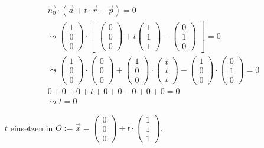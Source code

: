 \begin{gather}
	\vec{n_0} \cdot (\vec{a}+t\cdot \vec{r}-\vec{p})=0\\
	\leadsto 
	\begin{pmatrix}
	1\\0\\0
	\end{pmatrix} \cdot 
	\begin{bmatrix}
	\begin{pmatrix}
	0\\0\\0
	\end{pmatrix}
	+ t
	\begin{pmatrix}
	1\\1\\1
	\end{pmatrix}
	-
	\begin{pmatrix}
	0\\1\\0
	\end{pmatrix}
	\end{bmatrix} = 0\\
	\leadsto
	\begin{pmatrix}
	1\\0\\0
	\end{pmatrix}\cdot
	\begin{pmatrix}
	0\\0\\0
	\end{pmatrix}
	+
	\begin{pmatrix}
	1\\0\\0
	\end{pmatrix}
	\cdot
	\begin{pmatrix}
	t\\t\\t
	\end{pmatrix}
	-
	\begin{pmatrix}
	1\\0\\0
	\end{pmatrix}
	\cdot
	\begin{pmatrix}
	0\\1\\0
	\end{pmatrix} =0\\
	0+0+0+t+0+0-0+0+0=0\\
	\leadsto t=0
\end{gather}

\ensuremath{t} einsetzen in \ensuremath{O:= \vec{x}=\begin{pmatrix}
		0\\0\\0
	\end{pmatrix} +t\cdot\begin{pmatrix}
		1\\1\\1
\end{pmatrix}}.\\

